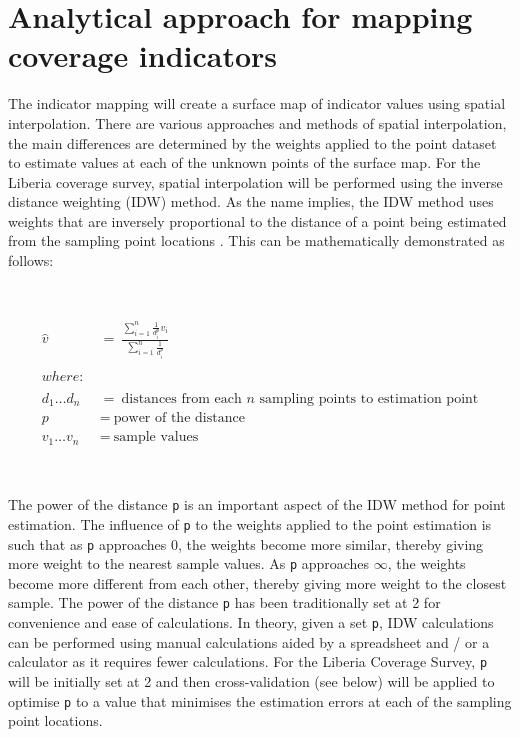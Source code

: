 \documentclass[12pt,a4paper]{book}
\theoremstyle{definition}
\theoremstyle{definition}
\theoremstyle{definition}
\theoremstyle{remark}
\begin{document}
\hypertarget{analytical-approach-for-mapping-coverage-indicators}{%
\section{Analytical approach for mapping coverage
indicators}\label{analytical-approach-for-mapping-coverage-indicators}}

The indicator mapping will create a surface map of indicator values
using spatial interpolation. There are various approaches and methods of
spatial interpolation, the main differences are determined by the
weights applied to the point dataset to estimate values at each of the
unknown points of the surface map. For the Liberia coverage survey,
spatial interpolation will be performed using the inverse distance
weighting (IDW) method. As the name implies, the IDW method uses weights
that are inversely proportional to the distance of a point being
estimated from the sampling point locations
\citep{isaaks1989applied, diggle2007mbg, diggle2013statistical}. This
can be mathematically demonstrated as follows:

~

\[\begin{aligned}
\hat{v} & ~ = ~ \frac{\displaystyle \sum\limits_{i = 1}^{n} \frac{1}{d_{i}^{p}}v_{i}}{\displaystyle \sum\limits_{i = 1}^{n}\frac{1}{d_{i}^{p}}} \\
\\
where: & \\
\\
d_1 \ldots d_n & ~ = ~ \text{distances from each } n \text{ sampling points to estimation point} \\
p & ~ = ~ \text{power of the distance} \\
v_1 \ldots v_n & ~ = ~ \text{sample values}
\end{aligned}\]

~

The power of the distance \texttt{p} is an important aspect of the IDW
method for point estimation. The influence of \texttt{p} to the weights
applied to the point estimation is such that as \texttt{p} approaches 0,
the weights become more similar, thereby giving more weight to the
nearest sample values. As \texttt{p} approaches \(\infty\), the weights
become more different from each other, thereby giving more weight to the
closest sample. The power of the distance \texttt{p} has been
traditionally set at 2 for convenience and ease of calculations. In
theory, given a set \texttt{p}, IDW calculations can be performed using
manual calculations aided by a spreadsheet and / or a calculator as it
requires fewer calculations. For the Liberia Coverage Survey, \texttt{p}
will be initially set at 2 and then cross-validation (see below) will be
applied to optimise \texttt{p} to a value that minimises the estimation
errors at each of the sampling point locations.
\end{document}
